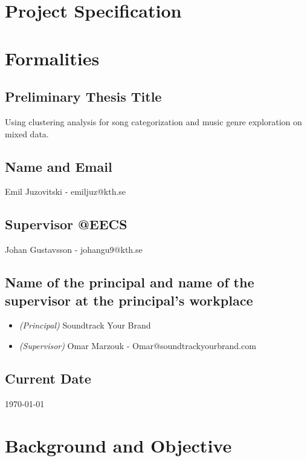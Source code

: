 \documentclass[a4paper,11pt]{article}
\begin{document}
\section*{Project Specification}

\section{Formalities}

\subsection{Preliminary Thesis Title}

Using clustering analysis for song categorization and
music genre exploration on mixed data.

\subsection{Name and Email}

Emil Juzovitski - emiljuz@kth.se

\subsection{Supervisor @EECS}

Johan Gustavsson - johangu9@kth.se

\subsection{Name of the principal and name of the supervisor at the
principal's workplace}

\begin{itemize}
\item
  \textit{(Principal)} Soundtrack Your Brand
\item
  \textit{(Supervisor)} Omar Marzouk - Omar@soundtrackyourbrand.com
\end{itemize}

\subsection{Current Date}

\today

\pagebreak

\section{Background and Objective}
\end{document}
